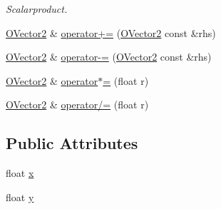 \begin{DoxyCompactItemize}
\begin{DoxyCompactList}\small\item\em Scalarproduct. \end{DoxyCompactList}\item 
\hyperlink{struct_osiris_i_1_1_o_vector2}{O\-Vector2} \& \hyperlink{struct_osiris_i_1_1_o_vector2_ab23590ea35479e071705e8610dd5144b}{operator+=} (\hyperlink{struct_osiris_i_1_1_o_vector2}{O\-Vector2} const \&rhs)
\item 
\hyperlink{struct_osiris_i_1_1_o_vector2}{O\-Vector2} \& \hyperlink{struct_osiris_i_1_1_o_vector2_a2cd0732fb344596f46897c66a2104696}{operator-\/=} (\hyperlink{struct_osiris_i_1_1_o_vector2}{O\-Vector2} const \&rhs)
\item 
\hyperlink{struct_osiris_i_1_1_o_vector2}{O\-Vector2} \& \hyperlink{struct_osiris_i_1_1_o_vector2_a29248603c40a8fe41606b5cce038d7f3}{operator$\ast$=} (float r)
\item 
\hyperlink{struct_osiris_i_1_1_o_vector2}{O\-Vector2} \& \hyperlink{struct_osiris_i_1_1_o_vector2_a29bd51478fb1e7fbf12ca8a2d2330ee5}{operator/=} (float r)
\end{DoxyCompactItemize}
\subsection*{Public Attributes}
\begin{DoxyCompactItemize}
\item 
float \hyperlink{struct_osiris_i_1_1_o_vector2_a84f3e40c0b1cd8b79708a5a90132f47a}{x}
\item 
float \hyperlink{struct_osiris_i_1_1_o_vector2_a8cee2693858779af0e001978c270a07b}{y}
\end{DoxyCompactItemize}


